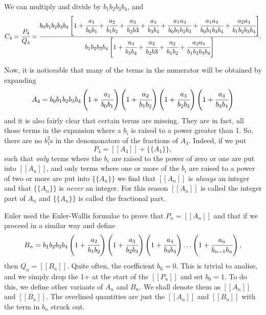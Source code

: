 \documentclass[16pt]{article}
\numberwithin{equation}{section}
\numberwithin{figure}{section}
\numberwithin{figure}{section}
\numberwithin{equation}{section}
\begin{document}
We can multiply and divide by $b_1 b_2 b_3 b_4$, and
\begin{equation}
C_4 =\cfrac{P_4}{Q_4}= \cfrac{b_0 b_1 b_2 b_3 b_4 \left [
1+\cfrac{a_1}{b_0 b_1}+\cfrac{a_2}{b_1 b_2}+\cfrac{a_3}{b_2 b3}+\cfrac{a_4}{b_3 b_4}
+\cfrac{a_1 a_3}{b_0 b_1 b_2 b_3} +\cfrac{a_1 a_4}{b_0 b_1 b_3 b_4}+\cfrac{a_2 a_4}{b_1 b_2 b_3 b_4} \right ]
}
{ 
b_1 b_2 b_3 b_4 \left [ 1+\cfrac{a_4}{b_3 b_4}+\cfrac{a_3}{b_2 b3}+  \cfrac{a_2}{b_1 b_2}+\cfrac{a_2 a_4}{b_1 b_2 b_3 b_4}
  \right ]}.
\end{equation}

Now, it is noticeable that many of the terms in the numerator will be obtained by
expanding
\begin{equation}
A_4=b_0 b_1 b_2 b_3 b_4  \left ( 1+\cfrac{a_1}{b_0 b_1}  \right )\left ( 1+\cfrac{a_2}{b_1 b_2}  \right )
\left ( 1+\cfrac{a_3}{b_2 b_3}  \right )\left ( 1+\cfrac{a_4}{b_3 b_4}  \right )
\end{equation}
and it is also fairly clear that certain terms are missing. They are in fact, all those terms in the
expansion where a $b_i$ is raised to a power greater than 1. So, there are no $b_1^2$s in the denomonators of
the fractions of $A_4$. Indeed, if we put
\begin{equation}
P_4=[[A_4]]+\lbrace \lbrace A_4  \rbrace \rbrace,
\end{equation}
such that {\em only} terms where the $b_i$ are raised to the power of zero or one are put into $[[A_n]]$,
and only terms where one or more of the $b_i$ are raised to a power of two or more are
 put into  $\lbrace \lbrace A_n \rbrace \rbrace$ we find that $[[A_n]]$ is {\em always} an integer
and that $\lbrace \lbrace A_n \rbrace \rbrace$ is {\em never} an integer.
For this reason
 $[[A_n]]$ is called the integer part of $A_n$ and $\lbrace \lbrace A_n \rbrace \rbrace$ is called the fractional
part.

Euler used the Euler-Wallis formulae to prove that $P_n=[[A_n]]$ and that if we proceed in a similar way and define 
\begin{equation}
B_n=b_1 b_2 b_3 b_4 \left ( 1+\cfrac{a_2}{b_1 b_2}  \right )
\left ( 1+\cfrac{a_3}{b_2 b_3}  \right )\left ( 1+\cfrac{a_4}{b_3 b_4}  \right ) \ldots \left ( 1+\cfrac{a_n}{b_{n-1} b_n}  \right ),
\end{equation}
then $Q_n=[[B_n]]$.
Quite  often, the coefficient $b_0=0$. This is trivial to analise,  and we simply drop the 1+ at the start of the $[[P_n]]$ and
set $b_0=1$. To do this, we define other variants of $A_n$ and $B_n$.
We shall denote them as $\overline{[[A_n]]}$ and $\overline{[[B_n]]}$. The overlined quantities are just the $[[A_n]]$
and $[[B_n]]$ with the term in $b_n$ struck out. 
\end{document}
